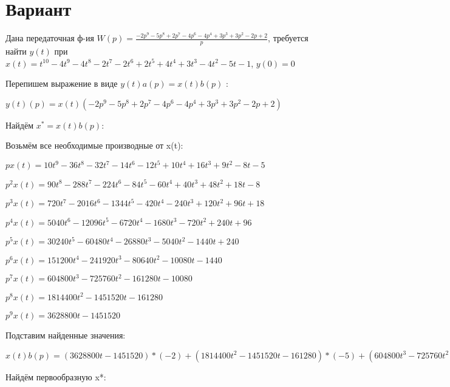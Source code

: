 \documentclass{article}
\begin{document}
\section{Вариант}

Дана передаточная ф-ия $W(p)=\frac{-2p^{9}-5p^{8}+2p^{7}-4p^{6}-4p^{4}+3p^{3}+3p^{2}-2p+2}{p}$, требуется найти $y(t)$ при $x(t)=t^{10}-4t^{9}-4t^{8}-2t^{7}-2t^{6}+2t^{5}+4t^{4}+3t^{3}-4t^{2}-5t-1$, $y(0)=0$

Перепишем выражение в виде $y(t)a(p)=x(t)b(p)$ :

$y(t)(p)=x(t)(-2p^{9}-5p^{8}+2p^{7}-4p^{6}-4p^{4}+3p^{3}+3p^{2}-2p+2)$

Найдём $x^*=x(t)b(p)$:

Возьмём все необходимые производные от x(t):

$px(t)=10t^{9}-36t^{8}-32t^{7}-14t^{6}-12t^{5}+10t^{4}+16t^{3}+9t^{2}-8t-5$

$p^2x(t)=90t^{8}-288t^{7}-224t^{6}-84t^{5}-60t^{4}+40t^{3}+48t^{2}+18t-8$

$p^3x(t)=720t^{7}-2016t^{6}-1344t^{5}-420t^{4}-240t^{3}+120t^{2}+96t+18$

$p^4x(t)=5040t^{6}-12096t^{5}-6720t^{4}-1680t^{3}-720t^{2}+240t+96$

$p^5x(t)=30240t^{5}-60480t^{4}-26880t^{3}-5040t^{2}-1440t+240$

$p^6x(t)=151200t^{4}-241920t^{3}-80640t^{2}-10080t-1440$

$p^7x(t)=604800t^{3}-725760t^{2}-161280t-10080$

$p^8x(t)=1814400t^{2}-1451520t-161280$

$p^9x(t)=3628800t-1451520$

Подставим найденные значения:

$x(t)b(p) = (3628800t-1451520)*(-2)+(1814400t^{2}-1451520t-161280)*(-5)+(604800t^{3}-725760t^{2}-161280t-10080)*2+(151200t^{4}-241920t^{3}-80640t^{2}-10080t-1440)*(-4)+(5040t^{6}-12096t^{5}-6720t^{4}-1680t^{3}-720t^{2}+240t+96)*(-4)+(720t^{7}-2016t^{6}-1344t^{5}-420t^{4}-240t^{3}+120t^{2}+96t+18)*3+(90t^{8}-288t^{7}-224t^{6}-84t^{5}-60t^{4}+40t^{3}+48t^{2}+18t-8)*3+(10t^{9}-36t^{8}-32t^{7}-14t^{6}-12t^{5}+10t^{4}+16t^{3}+9t^{2}-8t-5)*(-2)+(10t^{9}-36t^{8}-32t^{7}-14t^{6}-12t^{5}+10t^{4}+16t^{3}+9t^{2}-8t-5)*2=270t^{8}+1296t^{7}-26880t^{6}+44100t^{5}-579360t^{4}+2183400t^{3}-10197576t^{2}-282858t$





Найдём первообразную x*:
\end{document}
